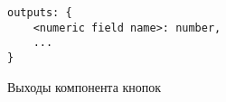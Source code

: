 \begin{figure}[!ht]
	\centering
	\vspace{\toppaddingoffigure}
	\begin{lstlisting}
outputs: {
    <numeric field name>: number,
    ...
}
    \end{lstlisting}
	\caption{Выходы компонента кнопок}
	\label{f:button-component-outputs}
\end{figure}

\newpage


